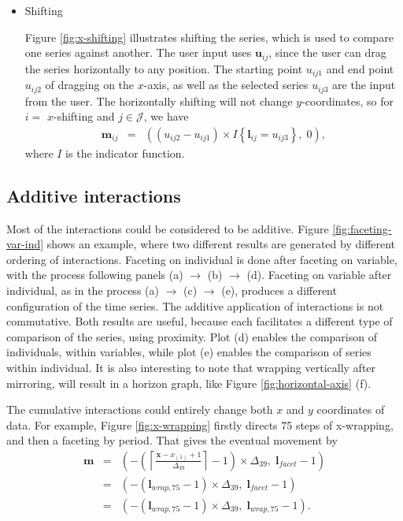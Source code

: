 \documentclass[12pt]{article}
\begin{document}
\begin{itemize}
\item Shifting 

Figure \ref{fig:x-shifting} illustrates shifting the series, which is used to compare one series against another. The user input uses $\mathbf{u}{}_{ij}$, since the user can drag the
series horizontally to any position. The starting point
$u_{ij1}$ and end point $u_{ij2}$ of dragging on the $x$-axis,
as well as the selected series $u_{ij3}$ are the input from the user.
The horizontally shifting will not change $y$-coordinates, so for
$i=$ $x$-shifting and $j\in\mathcal{J}$, we have
\begin{eqnarray*}
\mathbf{m}{}_{ij} & = & 
((u_{ij2}-u_{ij1})\times I\left\{ \mathbf{l}{}_{ij}=u_{ij3}\right\}, \; 0),
\end{eqnarray*}
where $I$ is the indicator function.

\end{itemize}

\subsection{Additive interactions\label{interaction-addition}}

Most of the interactions could be considered to be additive.
Figure \ref{fig:faceting-var-ind} shows an example, where two
different results are generated by different ordering of interactions.
Faceting on individual is done after faceting on variable, with the
process following panels (a) $\rightarrow$ (b) $\rightarrow$ (d).
Faceting on variable after individual, as in the process (a)
$\rightarrow$ (c) $\rightarrow$ (e), produces a different
configuration of the time series. The additive application of
interactions is not commutative. Both results are useful, because
each facilitates a different type of comparison of the series,
using proximity. Plot (d) enables the comparison of individuals,
within variables, while plot (e) enables the comparison of series
within individual. It is also interesting to
note that wrapping vertically after mirroring, will result in
a horizon graph, like Figure \ref{fig:horizontal-axis} (f).

The cumulative interactions could
entirely change both $x$ and $y$ coordinates of data.
For example, Figure \ref{fig:x-wrapping} firstly directs
75 steps of x-wrapping, and then a faceting by
period. That gives the eventual movement by
\begin{eqnarray*}
\mathbf{m} & = & (-\left(\left\lceil \frac{\mathbf{x}-x_{(1)}+1}{\Delta_{39}}\right\rceil -1\right)\times\Delta_{39}, \; \mathbf{l}{}_{facet}-1) \\
& = & (-(\mathbf{l}{}_{wrap,75} -1)\times\Delta_{39}, \; \mathbf{l}{}_{facet}-1) \\
& = & (-(\mathbf{l}{}_{wrap,75} -1)\times\Delta_{39}, \; \mathbf{l}{}_{wrap,75}-1).
\end{eqnarray*}
\end{document}
